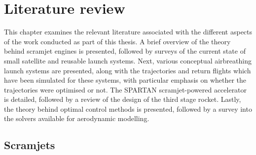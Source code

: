
\cleardoublepage
\chapter{Literature review}\label{chapter:literature-review}


  This chapter examines the relevant literature associated with the different aspects of the work conducted as part of this thesis. A brief overview of the theory behind scramjet engines is presented, followed by surveys of the current state of small satellite and reusable launch systems. Next, various conceptual airbreathing launch systems are presented, along with the trajectories and return flights which have been simulated for these systems, with particular emphasis on whether the trajectories were optimised or not. The SPARTAN scramjet-powered accelerator is detailed, followed by a review of the design of the third stage rocket. Lastly, the theory behind optimal control methods is presented, followed by a survey into the solvers available for aerodynamic modelling. 
  
  
 
  
  
  
  
  
  \section{Scramjets}
 

  
  
 
  
